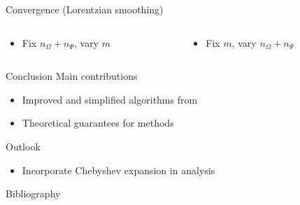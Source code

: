 \documentclass[aspectratio=169, leqno, 12pt]{beamer}
\begin{document}
\begin{frame}{Convergence (Lorentzian smoothing)}
    \begin{columns}
        \begin{column}{0.5\textwidth}
            \begin{itemize}
                \item Fix $n_{\Omega} + n_{\Psi}$, vary $m$
            \end{itemize}
            \scalebox{1.0}{}
        \end{column}
        \begin{column}{0.5\textwidth}
            \begin{itemize}
                \item Fix $m$, vary $n_{\Omega} + n_{\Psi}$
            \end{itemize}
            \scalebox{1.0}{}
        \end{column}
    \end{columns}
\end{frame}

\begin{frame}{Conclusion}
    Main contributions
    \begin{itemize}
        \item Improved and simplified algorithms from \cite{lin2017randomized}
        \item Theoretical guarantees for methods
    \end{itemize}
    Outlook
    \begin{itemize}
        \item Incorporate Chebyshev expansion in analysis
    \end{itemize}
\end{frame}

\begin{frame}[allowframebreaks]{Bibliography}
    
\end{frame}
\end{document}
